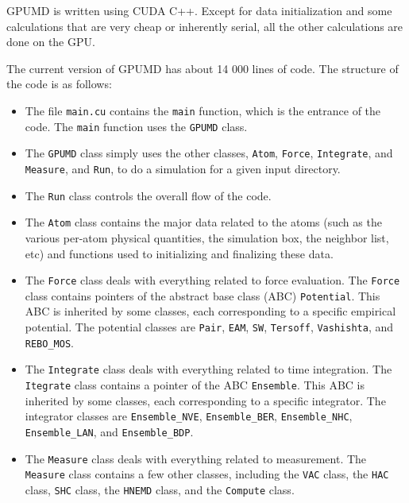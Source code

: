 \documentclass[12pt,a4paper]{report}
\begin{document}
GPUMD is written using CUDA C++. Except for data initialization and some calculations that are very cheap or inherently serial, all the other calculations are done on the GPU.

The current version of GPUMD has about 14 000 lines of code. The structure of the code is as follows:
\begin{itemize}
\item The file \verb"main.cu" contains the \verb"main" function, which is the entrance of the code. The \verb"main" function uses the \verb"GPUMD" class. 

\item The  \verb"GPUMD" class simply uses the other classes,  \verb"Atom", \verb"Force", \verb"Integrate", and \verb"Measure", and \verb"Run", to do a simulation for a given input directory. 

\item The \verb"Run" class controls the overall flow of the code. 

\item The \verb"Atom" class contains the major data related to the atoms (such as the various per-atom physical quantities, the simulation box, the neighbor list, etc) and functions used to initializing and finalizing these data. 

\item The \verb"Force" class deals with everything related to force evaluation. The \verb"Force" class contains pointers of the abstract base class (ABC) \verb"Potential". This ABC is inherited by some classes, each corresponding to a specific empirical potential. The potential classes are \verb"Pair", \verb"EAM", \verb"SW", \verb"Tersoff", \verb"Vashishta", and \verb"REBO_MOS".

\item The \verb"Integrate" class deals with everything related to time integration. The \verb"Itegrate" class contains a pointer of the ABC \verb"Ensemble". This ABC is inherited by some classes, each corresponding to a specific integrator. The integrator classes are \verb"Ensemble_NVE", \verb"Ensemble_BER", \verb"Ensemble_NHC", \verb"Ensemble_LAN", and \verb"Ensemble_BDP".

\item The \verb"Measure" class deals with everything related to measurement. The \verb"Measure" class contains a few other classes, including the  \verb"VAC" class, the \verb"HAC" class, \verb"SHC" class, the \verb"HNEMD" class, and the \verb"Compute" class.
\end{itemize}
\end{document}
